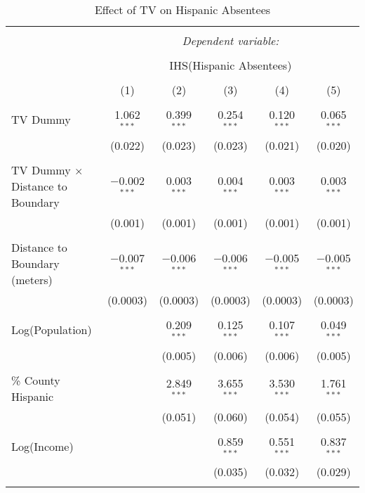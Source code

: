
\begin{table}[!htbp] \centering 
  \caption{Effect of TV on Hispanic Absentees} 
  \label{} 
\begin{tabular}{@{\extracolsep{-2pt}}lccccc} 
\\[-1.8ex]\hline 
\hline \\[-1.8ex] 
 & \multicolumn{5}{c}{\textit{Dependent variable:}} \\ 
\cline{2-6} 
\\[-1.8ex] & \multicolumn{5}{c}{IHS(Hispanic Absentees)} \\ 
\\[-1.8ex] & (1) & (2) & (3) & (4) & (5)\\ 
\hline \\[-1.8ex] 
 TV Dummy & 1.062$^{***}$ & 0.399$^{***}$ & 0.254$^{***}$ & 0.120$^{***}$ & 0.065$^{***}$ \\ 
  & (0.022) & (0.023) & (0.023) & (0.021) & (0.020) \\ 
  & & & & & \\ 
 TV Dummy $\times$ Distance to Boundary & $-$0.002$^{***}$ & 0.003$^{***}$ & 0.004$^{***}$ & 0.003$^{***}$ & 0.003$^{***}$ \\ 
  & (0.001) & (0.001) & (0.001) & (0.001) & (0.001) \\ 
  & & & & & \\ 
 Distance to Boundary (meters) & $-$0.007$^{***}$ & $-$0.006$^{***}$ & $-$0.006$^{***}$ & $-$0.005$^{***}$ & $-$0.005$^{***}$ \\ 
  & (0.0003) & (0.0003) & (0.0003) & (0.0003) & (0.0003) \\ 
  & & & & & \\ 
 Log(Population) &  & 0.209$^{***}$ & 0.125$^{***}$ & 0.107$^{***}$ & 0.049$^{***}$ \\ 
  &  & (0.005) & (0.006) & (0.006) & (0.005) \\ 
  & & & & & \\ 
 \% County Hispanic &  & 2.849$^{***}$ & 3.655$^{***}$ & 3.530$^{***}$ & 1.761$^{***}$ \\ 
  &  & (0.051) & (0.060) & (0.054) & (0.055) \\ 
  & & & & & \\ 
 Log(Income) &  &  & 0.859$^{***}$ & 0.551$^{***}$ & 0.837$^{***}$ \\ 
  &  &  & (0.035) & (0.032) & (0.029) \\ 
  & & & & & \\ 

\end{tabular}
\end{table}
